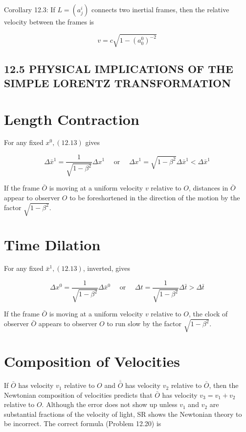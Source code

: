 \documentclass[10pt]{article}
\begin{document}
Corollary 12.3: If $L=\left(a_{j}^{i}\right)$ connects two inertial frames, then the relative velocity between the frames is


\begin{equation*}
v=c \sqrt{1-\left(a_{0}^{0}\right)^{-2}} \tag{12.15}
\end{equation*}


\subsection*{12.5 PHYSICAL IMPLICATIONS OF THE SIMPLE LORENTZ TRANSFORMATION}
\section*{Length Contraction}
For any fixed $x^{0},(12.13)$ gives

$$
\Delta \bar{x}^{1}=\frac{1}{\sqrt{1-\beta^{2}}} \Delta x^{1} \quad \text { or } \quad \Delta x^{1}=\sqrt{1-\beta^{2}} \Delta \bar{x}^{1}<\Delta \bar{x}^{1}
$$

If the frame $\bar{O}$ is moving at a uniform velocity $v$ relative to $O$, distances in $\bar{O}$ appear to observer $O$ to be foreshortened in the direction of the motion by the factor $\sqrt{1-\beta^{2}}$.

\section*{Time Dilation}
For any fixed $\bar{x}^{1},(12.13)$, inverted, gives

$$
\Delta x^{0}=\frac{1}{\sqrt{1-\beta^{2}}} \Delta \bar{x}^{0} \quad \text { or } \quad \Delta t=\frac{1}{\sqrt{1-\beta^{2}}} \Delta \bar{t}>\Delta \bar{t}
$$

If the frame $\bar{O}$ is moving at a uniform velocity $v$ relative to $O$, the clock of observer $\bar{O}$ appears to observer $O$ to run slow by the factor $\sqrt{1-\beta^{2}}$.

\section*{Composition of Velocities}
If $\bar{O}$ has velocity $v_{1}$ relative to $O$ and $\overline{\bar{O}}$ has velocity $v_{2}$ relative to $\bar{O}$, then the Newtonian composition of velocities predicts that $\bar{O}$ has velocity $v_{3}=v_{1}+v_{2}$ relative to $O$. Although the error does not show up unless $v_{1}$ and $v_{2}$ are substantial fractions of the velocity of light, SR shows the Newtonian theory to be incorrect. The correct formula (Problem 12.20) is
\end{document}
